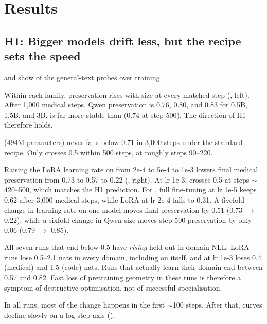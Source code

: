 \section{Results}
\label{sec:results}

\subsection{H1: Bigger models drift less, but the recipe sets the speed}
\label{sec:h1}



 and  show \pres of the general-text probes over training.

 Within each family, preservation rises with size at every matched step (, left). After 1,000 medical steps, Qwen preservation is 0.76, 0.80, and 0.83 for 0.5B, 1.5B, and 3B. \pythiaM is far more stable than \pythiaS (0.74  at step 500). The direction of H1 therefore holds.

 \qwenS (494M parameters) never falls below 0.71 in 3,000 steps under the standard recipe. Only \pythiaS crosses 0.5 within 500 steps, at roughly steps 90--220.

 Raising the LoRA learning rate on \qwenS from 2e-4 to 5e-4 to 1e-3 lowers final medical preservation from 0.73 to 0.57 to 0.22 (, right). At lr 1e-3, \qwenS crosses 0.5 at steps $\sim$420--500, which matches the H1 prediction. For \pythiaS, full fine-tuning at lr 1e-5 keeps 0.62 after 3,000 medical steps, while LoRA at lr 2e-4 falls to 0.31. A fivefold change in learning rate on one model moves final preservation by 0.51 (0.73 $\rightarrow$ 0.22), while a sixfold change in Qwen size moves step-500 preservation by only 0.06 (0.79 $\rightarrow$ 0.85).

 All seven runs that end below 0.5 have \emph{rising} held-out in-domain NLL. \pythiaS LoRA runs lose 0.5--2.1 nats in every domain, including on \wikitext itself, and \qwenS at lr 1e-3 loses 0.4 (medical) and 1.5 (code) nats. Runs that actually learn their domain end between 0.57 and 0.82. Fast loss of pretraining geometry in these runs is therefore a symptom of destructive optimisation, not of successful specialisation.

 In all runs, most of the change happens in the first $\sim$100 steps. After that, curves decline slowly on a log-step axis ().

